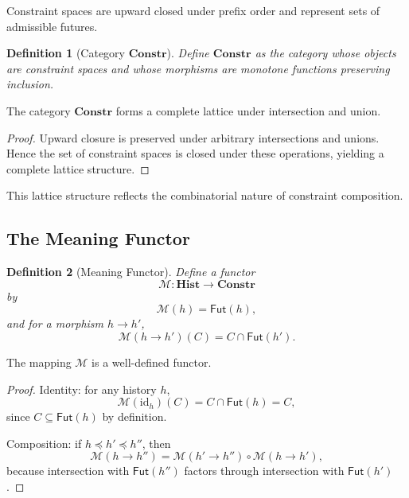 \documentclass[11pt]{article}
\newtheorem{definition}{Definition}
\begin{document}
Constraint spaces are upward closed under prefix order and represent sets of
admissible futures.

\begin{definition}[Category $\mathbf{Constr}$]
Define $\mathbf{Constr}$ as the category whose objects are constraint spaces and
whose morphisms are monotone functions preserving inclusion.
\end{definition}

\begin{lemma}
The category $\mathbf{Constr}$ forms a complete lattice under intersection and
union.
\end{lemma}

\begin{proof}
Upward closure is preserved under arbitrary intersections and unions. Hence the
set of constraint spaces is closed under these operations, yielding a complete
lattice structure.
\end{proof}

This lattice structure reflects the combinatorial nature of constraint
composition.

\subsection{The Meaning Functor}

\begin{definition}[Meaning Functor]
Define a functor
\[
\mathcal{M} : \mathbf{Hist} \to \mathbf{Constr}
\]
by
\[
\mathcal{M}(h) = \mathsf{Fut}(h),
\]
and for a morphism $h \to h'$,
\[
\mathcal{M}(h \to h')(C) = C \cap \mathsf{Fut}(h').
\]
\end{definition}

\begin{theorem}[Functoriality]
The mapping $\mathcal{M}$ is a well-defined functor.
\end{theorem}

\begin{proof}
Identity: for any history $h$,
\[
\mathcal{M}(\mathrm{id}_h)(C) = C \cap \mathsf{Fut}(h) = C,
\]
since $C \subseteq \mathsf{Fut}(h)$ by definition.

Composition: if $h \preceq h' \preceq h''$, then
\[
\mathcal{M}(h \to h'') = \mathcal{M}(h' \to h'') \circ \mathcal{M}(h \to h'),
\]
because intersection with $\mathsf{Fut}(h'')$ factors through intersection with
$\mathsf{Fut}(h')$.
\end{proof}
\end{document}
